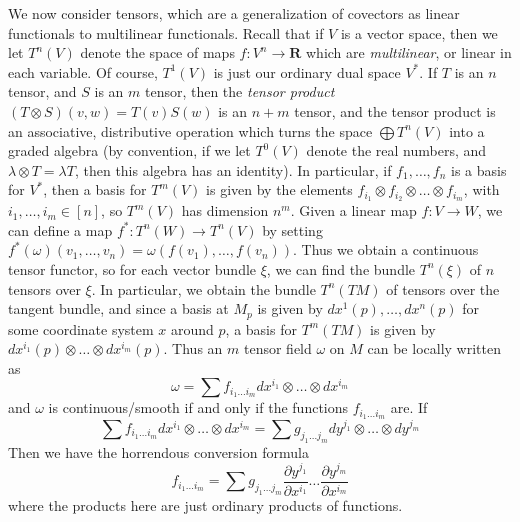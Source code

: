 We now consider tensors, which are a generalization of covectors as linear functionals to multilinear functionals. Recall that if $V$ is a vector space, then we let $T^n(V)$ denote the space of maps $f: V^n \to \mathbf{R}$ which are {\it multilinear}, or linear in each variable. Of course, $T^1(V)$ is just our ordinary dual space $V^*$. If $T$ is an $n$ tensor, and $S$ is an $m$ tensor, then the {\it tensor product} $(T \otimes S)(v,w) = T(v)S(w)$ is an $n + m$ tensor, and the tensor product is an associative, distributive operation which turns the space $\bigoplus T^n(V)$ into a graded algebra (by convention, if we let $T^0(V)$ denote the real numbers, and $\lambda \otimes T = \lambda T$, then this algebra has an identity). In particular, if $f_1, \dots, f_n$ is a basis for $V^*$, then a basis for $T^m(V)$ is given by the elements $f_{i_1} \otimes f_{i_2} \otimes \dots \otimes f_{i_m}$, with $i_1, \dots, i_m \in [n]$, so $T^m(V)$ has dimension $n^m$. Given a linear map $f: V \to W$, we can define a map $f^*: T^n(W) \to T^n(V)$ by setting $f^*(\omega)(v_1, \dots, v_n) = \omega(f(v_1), \dots, f(v_n))$. Thus we obtain a continuous tensor functor, so for each vector bundle $\xi$, we can find the bundle $T^n(\xi)$ of $n$ tensors over $\xi$. In particular, we obtain the bundle $T^n(TM)$ of tensors over the tangent bundle, and since a basis at $M_p$ is given by $dx^1(p), \dots, dx^n(p)$ for some coordinate system $x$ around $p$, a basis for $T^m(TM)$ is given by $dx^{i_1}(p) \otimes \dots \otimes dx^{i_m}(p)$. Thus an $m$ tensor field $\omega$ on $M$ can be locally written as
%
\[ \omega = \sum f_{i_1 \dots i_m} dx^{i_1} \otimes \dots \otimes dx^{i_m} \]
%
and $\omega$ is continuous/smooth if and only if the functions $f_{i_1 \dots i_m}$ are. If
%
\[ \sum f_{i_1 \dots i_m} dx^{i_1} \otimes \dots \otimes dx^{i_m} = \sum g_{j_1 \dots j_m} dy^{j_1} \otimes \dots \otimes dy^{j_m} \]
%
Then we have the horrendous conversion formula
%
\[ f_{i_1 \dots i_m} = \sum g_{j_1 \dots j_m} \frac{\partial y^{j_1}}{\partial x^{i_1}} \dots \frac{\partial y^{j_m}}{\partial x^{i_m}} \]
%
where the products here are just ordinary products of functions.

